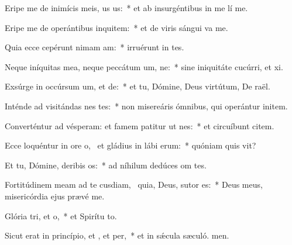 \item Eripe me de inimícis meis, us us:~* et ab insurgéntibus in me lí me.
\item Eripe me de operántibus inquitem:~* et de viris sángui va me.
\item Quia ecce cepérunt nimam am:~* irruérunt in  tes.
\item Neque iníquitas mea, neque peccátum um, ne:~* sine iniquitáte cucúrri, et xi.
\item Exsúrge in occúrsum um, et de:~* et tu, Dómine, Deus virtútum, De raël.
\item Inténde ad visitándas nes tes:~* non misereáris ómnibus, qui operántur initem.
\item Converténtur ad vésperam: et famem patitur ut nes:~* et circuíbunt citem.
\item Ecce loquéntur in ore o,~\pscross{} et gládius in lábi erum:~* quóniam quis vit?
\item Et tu, Dómine, deribis os:~* ad níhilum dedúces om tes.
\item Fortitúdinem meam ad te cusdiam,~\pscross{} quia, Deus, sutor  es:~* Deus meus, misericórdia ejus prævé me.
\item Glória tri, et o,~* et Spirítu to.
\item Sicut erat in princípio, et , et per,~* et in sǽcula sæculó. men.
